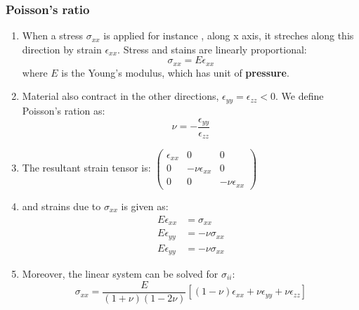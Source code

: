 \documentclass[12pt,a4paper]{article}
\begin{document}
    \subsubsection{Poisson's ratio} 
        \begin{enumerate}
            \item When a stress $\sigma_{xx}$ is applied for instance , along x axis, it streches along this direction by strain $\epsilon_{xx}$. Stress and stains are linearly proportional:
            \begin{equation}
                \sigma_{xx} = E \epsilon_{xx}
            \end{equation}
            where $E$ is the Young's modulus, which has unit of \textbf{pressure}.
            \item Material also contract in the other directions, $\epsilon_{yy} = \epsilon_{zz} < 0$. We define Poisson's ration as:
            \begin{equation}
                \nu = -\dfrac{\epsilon_{yy}}{\epsilon_{zz}}
            \end{equation}
            \item The resultant strain tensor is:
            $\begin{pmatrix}
                \epsilon_{xx} & 0 & 0\\
                0 & -\nu \epsilon_{xx} & 0\\
                0 & 0 & -\nu \epsilon_{xx}
            \end{pmatrix}$
            \item and strains due to $\sigma_{xx}$ is given as:
                \begin{align}
                    E\epsilon_{xx}  &= \sigma_{xx}\\
                    E\epsilon_{yy}  &= -\nu \sigma_{xx}\\
                    E\epsilon_{yy}  &= -\nu \sigma_{xx}
                \end{align}
            \item Moreover, the linear system can be solved for $\sigma_{ii}$:
            \begin{equation}
                \sigma_{xx}= \frac{E}{(1+\nu)(1-2\nu)}[(1-\nu)\epsilon_{xx}+\nu \epsilon_{yy}+ \nu\epsilon_{zz}]
            \end{equation}
        \end{enumerate}
\end{document}
